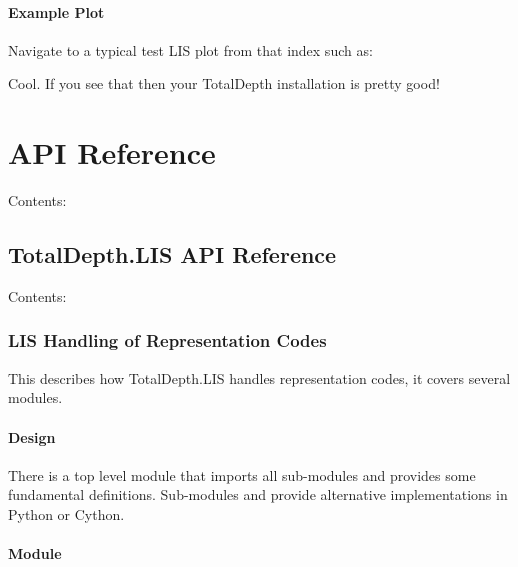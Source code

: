 \documentclass[letterpaper,10pt,english]{sphinxmanual}
\begin{document}
\noindent{}


\paragraph{Example Plot}
\label{\detokenize{testing/test_plot:example-plot}}
Navigate to a typical test LIS plot from that index such as:

\noindent{}

Cool. If you see that then your TotalDepth installation is pretty good!


\section{API Reference}
\label{\detokenize{ref/index_ref::doc}}\label{\detokenize{ref/index_ref:api-reference}}
Contents:


\subsection{TotalDepth.LIS API Reference}
\label{\detokenize{ref/LIS/index_LIS::doc}}\label{\detokenize{ref/LIS/index_LIS:totaldepth-lis-api-reference}}
Contents:


\subsubsection{LIS Handling of Representation Codes}
\label{\detokenize{ref/LIS/core/RepCode:lis-handling-of-representation-codes}}\label{\detokenize{ref/LIS/core/RepCode::doc}}
This describes how TotalDepth.LIS handles representation codes, it covers several modules.


\paragraph{Design}
\label{\detokenize{ref/LIS/core/RepCode:design}}
There is a top level module  that imports all sub-modules and provides some fundamental definitions. Sub-modules  and  provide alternative implementations in Python or Cython.


\paragraph{ Module}
\label{\detokenize{ref/LIS/core/RepCode:repcode-module}}
\end{document}
